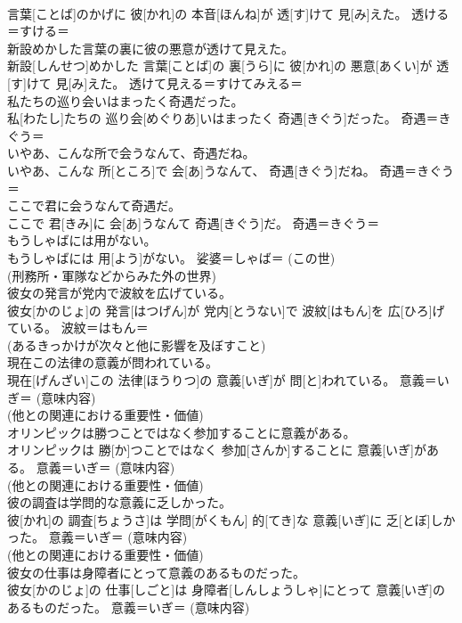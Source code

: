 \documentclass[8pt]{extreport}
\begin{document}
\begin{CJK}{UTF8}{min}
{\\	言葉[ことば]のかげに 彼[かれ]の 本音[ほんね]が 透[す]けて 見[み]えた。	透ける＝すける＝ 
\\	新設めかした言葉の裏に彼の悪意が透けて見えた。	
\\	新設[しんせつ]めかした 言葉[ことば]の 裏[うら]に 彼[かれ]の 悪意[あくい]が 透[す]けて 見[み]えた。	透けて見える＝すけてみえる＝ 
\\	私たちの巡り会いはまったく奇遇だった。	
\\	私[わたし]たちの 巡り会[めぐりあ]いはまったく 奇遇[きぐう]だった。	奇遇＝きぐう＝ 
\\	いやあ、こんな所で会うなんて、奇遇だね。	
\\	いやあ、こんな 所[ところ]で 会[あ]うなんて、 奇遇[きぐう]だね。	奇遇＝きぐう＝ 
\\	ここで君に会うなんて奇遇だ。	
\\	ここで 君[きみ]に 会[あ]うなんて 奇遇[きぐう]だ。	奇遇＝きぐう＝ 
\\	もうしゃばには用がない。	
\\	もうしゃばには 用[よう]がない。	娑婆＝しゃば＝ (この世) 
\\	(刑務所・軍隊などからみた外の世界) 
\\	彼女の発言が党内で波紋を広げている。	
\\	彼女[かのじょ]の 発言[はつげん]が 党内[とうない]で 波紋[はもん]を 広[ひろ]げている。	波紋＝はもん＝ 
\\	(あるきっかけが次々と他に影響を及ぼすこと) 
\\	現在この法律の意義が問われている。	
\\	現在[げんざい]この 法律[ほうりつ]の 意義[いぎ]が 問[と]われている。	意義＝いぎ＝ (意味内容) 
\\	(他との関連における重要性・価値) 
\\	オリンピックは勝つことではなく参加することに意義がある。	
\\	オリンピックは 勝[か]つことではなく 参加[さんか]することに 意義[いぎ]がある。	意義＝いぎ＝ (意味内容) 
\\	(他との関連における重要性・価値) 
\\	彼の調査は学問的な意義に乏しかった。	
\\	彼[かれ]の 調査[ちょうさ]は 学問[がくもん] 的[てき]な 意義[いぎ]に 乏[とぼ]しかった。	意義＝いぎ＝ (意味内容) 
\\	(他との関連における重要性・価値) 
\\	彼女の仕事は身障者にとって意義のあるものだった。	
\\	彼女[かのじょ]の 仕事[しごと]は 身障者[しんしょうしゃ]にとって 意義[いぎ]のあるものだった。	意義＝いぎ＝ (意味内容) 
}
\end{CJK}
\end{document}

